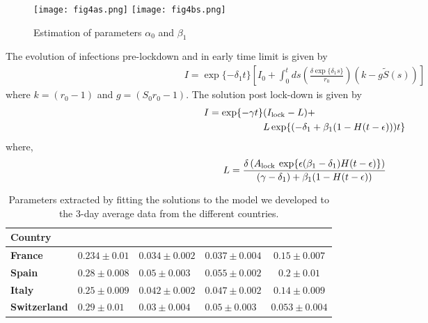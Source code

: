 \documentclass[aps,floatfix,prl,superscriptaddress]{revtex4}
\begin{document}
\begin{figure}[h]
	\texttt{[image: fig4as.png]} 
	\texttt{[image: fig4bs.png]}
	\caption{\label{fig4}Estimation of parameters $\alpha_0$ and $\beta_1$}
\end{figure}
The evolution of infections pre-lockdown and in early time limit is given by
\begin{align}
\label{pre_lock_infection}
I = \exp \{ -\delta_1 t \} \left[I_0 +  \int_0^t ds  \left( \frac{ \delta \exp\{ \delta_1 s \}}{ r_0} \right)
\left( k - g\tilde{S}(s) \right) \right]
\end{align}
where $k=(r_0-1)$ and $g=(S_0r_0-1)$. The solution post lock-down is given by
\begin{align}
\label{infections_post_lock}
I = \exp \{-\gamma t\}&(I_{\rm lock} - L) +  
\\
& L \exp\{ (-\delta_1 + \beta_1(1-{H}(t-\epsilon)))t \}
\end{align}
where, 
\begin{align}
L =  \frac{\delta \left( A_{\rm lock} \> \exp \{ \epsilon(\beta_1 - \delta_1) {H}(t-\epsilon) \} \right) } {(\gamma-\delta_1)+\beta_1(1-{H}(t-\epsilon))}
\end{align}
\begin{table} %
	\caption{\label{table1} Parameters extracted by fitting the solutions to the model we developed to the 3-day average data from the different countries.}
	\begin{ruledtabular}
		\begin{tabular}{|l|l|l|l|c|}
			Country & \pmb{$\alpha_0$} & \pmb{$\gamma$} & \pmb{$\delta_1$} &\pmb{$\beta_1$} 
			\\ \hline
			\textbf{France}    & $0.234 \pm 0.01$     & $0.034 \pm 0.002$ & $0.037 \pm 0.004$  & $0.15 \pm 0.007$         
			\\ 
			\textbf{Spain}     & $0.28 \pm 0.008$     & $0.05 \pm 0.003$   & $0.055 \pm 0.002$ & $0.2 \pm 0.01$                                    
			\\ 
			\textbf{Italy}     & $0.25 \pm 0.009$      & $0.042 \pm 0.002$  & $0.047 \pm 0.002$   &  $0.14 \pm 0.009$                                    
			\\ 
			\textbf{Switzerland} & $0.29 \pm 0.01$   &   $0.03 \pm 0.004$         & $0.05 \pm 0.003$     &  $0.053 \pm 0.004$                                  
			\\ 
		\end{tabular}
	\end{ruledtabular}
\end{table}
\end{document}
